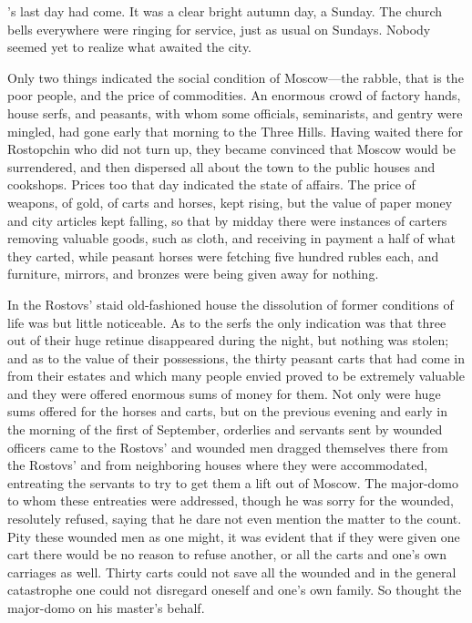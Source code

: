 's last day had come. It was a clear bright autumn day, a
Sunday.  The church bells everywhere were ringing for service,
just as usual on Sundays. Nobody seemed yet to realize what
awaited the city.

Only two things indicated the social condition of Moscow---the
rabble, that is the poor people, and the price of commodities. An
enormous crowd of factory hands, house serfs, and peasants, with
whom some officials, seminarists, and gentry were mingled, had
gone early that morning to the Three Hills. Having waited there
for Rostopchin who did not turn up, they became convinced that
Moscow would be surrendered, and then dispersed all about the
town to the public houses and cookshops. Prices too that day
indicated the state of affairs. The price of weapons, of gold, of
carts and horses, kept rising, but the value of paper money and
city articles kept falling, so that by midday there were
instances of carters removing valuable goods, such as cloth, and
receiving in payment a half of what they carted, while peasant
horses were fetching five hundred rubles each, and furniture,
mirrors, and bronzes were being given away for nothing.

In the Rostovs' staid old-fashioned house the dissolution of
former conditions of life was but little noticeable. As to the
serfs the only indication was that three out of their huge
retinue disappeared during the night, but nothing was stolen; and
as to the value of their possessions, the thirty peasant carts
that had come in from their estates and which many people envied
proved to be extremely valuable and they were offered enormous
sums of money for them. Not only were huge sums offered for the
horses and carts, but on the previous evening and early in the
morning of the first of September, orderlies and servants sent by
wounded officers came to the Rostovs' and wounded men dragged
themselves there from the Rostovs' and from neighboring houses
where they were accommodated, entreating the servants to try to
get them a lift out of Moscow. The major-domo to whom these
entreaties were addressed, though he was sorry for the wounded,
resolutely refused, saying that he dare not even mention the
matter to the count. Pity these wounded men as one might, it was
evident that if they were given one cart there would be no reason
to refuse another, or all the carts and one's own carriages as
well. Thirty carts could not save all the wounded and in the
general catastrophe one could not disregard oneself and one's own
family. So thought the major-domo on his master's behalf.

